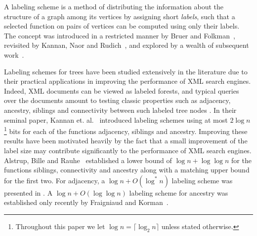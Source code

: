 \documentclass{llncs}
\newcommand{\sd}[1]{{#1}}
\begin{document}
A labeling scheme is a  method of distributing the information about the
structure of a graph among its vertices by assigning short \emph{labels},
such that a selected function on pairs of vertices can be computed using only their labels.
The concept  was introduced in a restricted manner by Bruer and Folkman~\cite{Breuer67}, revisited by Kannan, Naor and Rudich~\cite{Kannan92},
and explored by a wealth of subsequent work~\cite{Alstrup02,Alstrup05,Korman10,alstrup2013near,Thorup01,Peleg00}.

Labeling schemes for trees have been studied extensively in the literature due
to their practical applications in improving the performance of XML search
engines. Indeed, XML documents can be viewed as labeled forests, and typical
queries over the documents amount to testing classic properties such as
adjacency, ancestry, siblings and connectivity  between such labeled tree nodes
\cite{wu2004prime}. In their seminal paper, Kannan et. al.~\cite{Kannan92}
introduced labeling schemes using at most $2\log n$ \footnote{Throughout this
paper we let $\log n = \lceil \log_2 n \rceil$ unless stated otherwise.} bits
for each of the functions adjacency, siblings  and ancestry. Improving
these results have been motivated heavily by the fact that a small improvement
of the label size may contribute significantly to the performance of XML search
engines. Alstrup, Bille and Rauhe~\cite{Alstrup05} established a lower bound of
$\log n + \log \log n$ for the functions siblings, connectivity and ancestry
along with a matching upper bound for the first two. \sd{For adjacency, a $\log n +
O(\log^* n)$ labeling scheme was presented in \cite{Alstrup02}.} A $\log n +
O(\log \log n)$  labeling scheme for ancestry was established only recently by
Fraigniaud and Korman~\cite{Korman10}.
\end{document}
